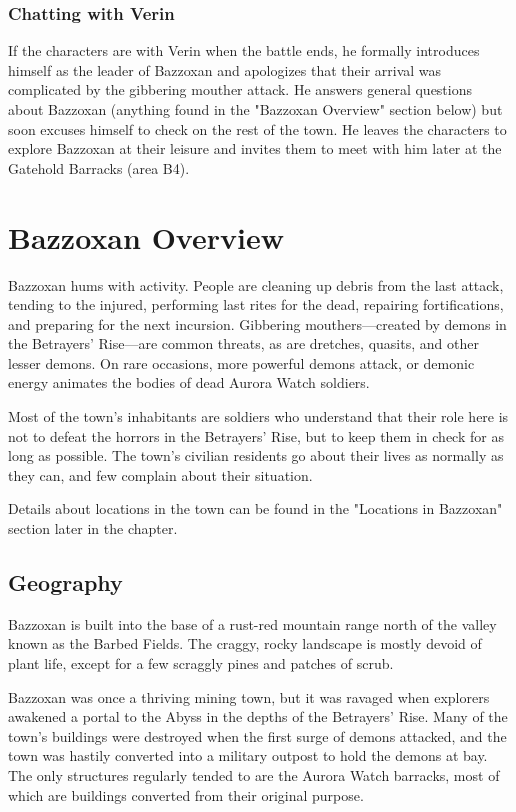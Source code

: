 \documentclass[letterpaper, 11pt, bg=full, twocolumn]{dndbook}
\begin{document}
\subsubsection{Chatting with Verin}

If the characters are with Verin when the battle ends, he formally introduces himself as the leader of Bazzoxan and apologizes that their arrival was complicated by the gibbering mouther attack. He answers general questions about Bazzoxan (anything found in the "Bazzoxan Overview" section below) but soon excuses himself to check on the rest of the town. He leaves the characters to explore Bazzoxan at their leisure and invites them to meet with him later at the Gatehold Barracks (area B4).
\section{Bazzoxan Overview}

Bazzoxan hums with activity. People are cleaning up debris from the last attack, tending to the injured, performing last rites for the dead, repairing fortifications, and preparing for the next incursion. Gibbering mouthers---created by demons in the Betrayers' Rise---are common threats, as are dretches, quasits, and other lesser demons. On rare occasions, more powerful demons attack, or demonic energy animates the bodies of dead Aurora Watch soldiers.

Most of the town's inhabitants are soldiers who understand that their role here is not to defeat the horrors in the Betrayers' Rise, but to keep them in check for as long as possible. The town's civilian residents go about their lives as normally as they can, and few complain about their situation.

Details about locations in the town can be found in the "Locations in Bazzoxan" section later in the chapter.


\subsection{Geography}

Bazzoxan is built into the base of a rust-red mountain range north of the valley known as the Barbed Fields. The craggy, rocky landscape is mostly devoid of plant life, except for a few scraggly pines and patches of scrub.

Bazzoxan was once a thriving mining town, but it was ravaged when explorers awakened a portal to the Abyss in the depths of the Betrayers' Rise. Many of the town's buildings were destroyed when the first surge of demons attacked, and the town was hastily converted into a military outpost to hold the demons at bay. The only structures regularly tended to are the Aurora Watch barracks, most of which are buildings converted from their original purpose.
\end{document}
